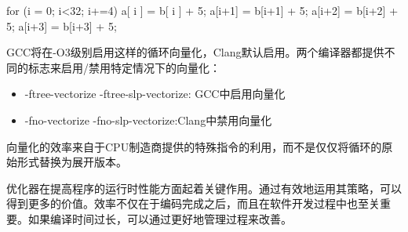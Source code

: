 \begin{cpp}
for (i = 0; i<32; i+=4) {
    a[ i ] = b[ i ] + 5;
    a[i+1] = b[i+1] + 5;
    a[i+2] = b[i+2] + 5;
    a[i+3] = b[i+3] + 5;
}
\end{cpp}

GCC将在-O3级别启用这样的循环向量化，Clang默认启用。两个编译器都提供不同的标志来启用/禁用特定情况下的向量化：

\begin{itemize}
\item
-ftree-vectorize -ftree-slp-vectorize: GCC中启用向量化

\item
-fno-vectorize -fno-slp-vectorize:Clang中禁用向量化
\end{itemize}

向量化的效率来自于CPU制造商提供的特殊指令的利用，而不是仅仅将循环的原始形式替换为展开版本。

优化器在提高程序的运行时性能方面起着关键作用。通过有效地运用其策略，可以得到更多的价值。效率不仅在于编码完成之后，而且在软件开发过程中也至关重要。如果编译时间过长，可以通过更好地管理过程来改善。














